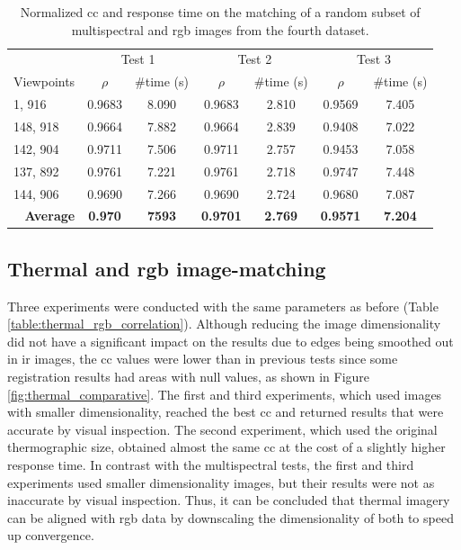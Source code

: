 \renewcommand{\arraystretch}{1.1}
\begin{table}
    \footnotesize
    \caption{Normalized \acrshort{cc} and response time on the matching of a random subset of multispectral and \acrshort{rgb} images from the fourth dataset.}
    \label{table:multispectral_rgb_correlation}
    \begin{tabular}{l|cc|cc|cc}
        \toprule
        \multicolumn{1}{c}{} & \multicolumn{2}{c}{Test 1} & \multicolumn{2}{c}{Test 2} & \multicolumn{2}{c}{Test 3}\\
        \cmidrule{1-7}
        Viewpoints & $\rho$ & \#time (\si{\second}) & $\rho$ & \#time (\si{\second}) & $\rho$ & \#time (\si{\second})\\
        \cmidrule{1-7}
        1, 916 & 0.9683 & 8.090 & 0.9683 & 2.810 & 0.9569 & 7.405\\
        148, 918 & 0.9664 & 7.882 & 0.9664 & 2.839 & 0.9408 & 7.022\\
        142, 904 & 0.9711 & 7.506 & 0.9711 & 2.757 & 0.9453 & 7.058\\ 
        137, 892 & 0.9761 & 7.221 & 0.9761 & 2.718 & 0.9747 & 7.448\\
        144, 906 & 0.9690 & 7.266 & 0.9690 & 2.724 & 0.9680 & 7.087\\
        \cmidrule{1-7}
        \multicolumn{1}{r|}{\textbf{Average}} & \textbf{0.970} & \textbf{7593} & \textbf{0.9701} & \textbf{2.769} & \textbf{0.9571} & \textbf{7.204}\\
        \bottomrule
    \end{tabular}
    \normalsize
\end{table}
\renewcommand{\arraystretch}{1}

\subsection{Thermal and \acrshort{rgb} image-matching}

Three experiments were conducted with the same parameters as before (Table \ref{table:thermal_rgb_correlation}). Although reducing the image dimensionality did not have a significant impact on the results due to edges being smoothed out in \acrshort{ir} images, the \acrshort{cc} values were lower than in previous tests since some registration results had areas with null values, as shown in Figure \ref{fig:thermal_comparative}. The first and third experiments, which used images with smaller dimensionality, reached the best \acrshort{cc} and returned results that were accurate by visual inspection. The second experiment, which used the original thermographic size, obtained almost the same \acrshort{cc} at the cost of a slightly higher response time. In contrast with the multispectral tests, the first and third experiments used smaller dimensionality images, but their results were not as inaccurate by visual inspection. Thus, it can be concluded that thermal imagery can be aligned with \acrshort{rgb} data by downscaling the dimensionality of both to speed up convergence. 

